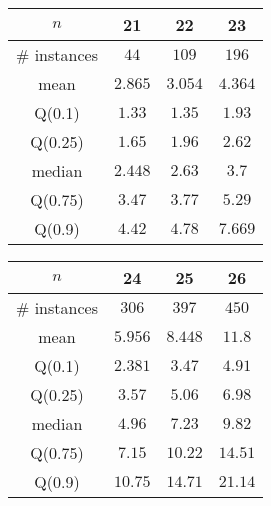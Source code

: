 \begin{tabular}{c|ccc} 
\hline 
$n$ & 21 & 22 & 23 \tabularnewline 
\hline 
\hline 
\# instances & $44$ & $109$ & $196$ \tabularnewline 
mean & $2.865$ & $3.054$ & $4.364$ \tabularnewline 
Q(0.1) & $1.33$ & $1.35$ & $1.93$ \tabularnewline 
Q(0.25) & $1.65$ & $1.96$ & $2.62$ \tabularnewline 
median & $2.448$ & $2.63$ & $3.7$ \tabularnewline 
Q(0.75) & $3.47$ & $3.77$ & $5.29$ \tabularnewline 
Q(0.9) & $4.42$ & $4.78$ & $7.669$ \tabularnewline 
\hline 
\end{tabular} 
\medskip{} 

\begin{tabular}{c|ccc} 
\hline 
$n$ & 24 & 25 & 26 \tabularnewline 
\hline 
\hline 
\# instances & $306$ & $397$ & $450$ \tabularnewline 
mean & $5.956$ & $8.448$ & $11.8$ \tabularnewline 
Q(0.1) & $2.381$ & $3.47$ & $4.91$ \tabularnewline 
Q(0.25) & $3.57$ & $5.06$ & $6.98$ \tabularnewline 
median & $4.96$ & $7.23$ & $9.82$ \tabularnewline 
Q(0.75) & $7.15$ & $10.22$ & $14.51$ \tabularnewline 
Q(0.9) & $10.75$ & $14.71$ & $21.14$ \tabularnewline 
\hline 
\end{tabular} 
\medskip{} 


